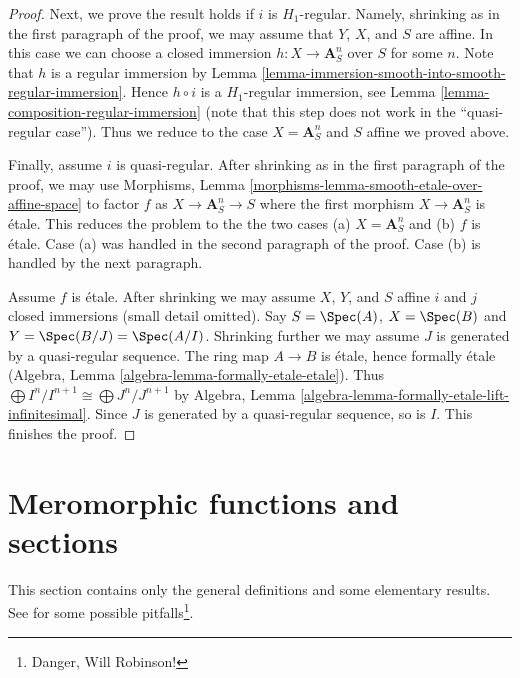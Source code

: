 \begin{proof}
\medskip\noindent
Next, we prove the result holds if $i$ is $H_1$-regular.
Namely, shrinking as in the first paragraph of the proof, we may assume that
$Y$, $X$, and $S$ are affine. In this case we can choose a closed
immersion $h : X \to \mathbf{A}^n_S$ over $S$ for some $n$. Note that
$h$ is a regular immersion by
Lemma \ref{lemma-immersion-smooth-into-smooth-regular-immersion}.
Hence $h \circ i$ is a $H_1$-regular immersion, see
Lemma \ref{lemma-composition-regular-immersion} (note that this step
does not work in the ``quasi-regular case'').
Thus we reduce to the case $X = \mathbf{A}^n_S$ and $S$ affine
we proved above.

\medskip\noindent
Finally, assume $i$ is quasi-regular. After shrinking as in the first
paragraph of the proof, we may use Morphisms, Lemma
\ref{morphisms-lemma-smooth-etale-over-affine-space}
to factor $f$ as $X \to \mathbf{A}^n_S \to S$ where the first
morphism $X \to \mathbf{A}^n_S$ is \'etale. This reduces the problem
to the the two cases (a) $X = \mathbf{A}^n_S$ and (b) $f$ is \'etale.
Case (a) was handled in the second paragraph of the proof.
Case (b) is handled by the next paragraph.

\medskip\noindent
Assume $f$ is \'etale. After shrinking we may assume $X$, $Y$, and $S$
affine $i$ and $j$ closed immersions (small detail omitted).
Say $S = \Spec(A)$, $X = \Spec(B)$ and $Y = \Spec(B/J) = \Spec(A/I)$.
Shrinking further we may assume $J$ is generated by a quasi-regular sequence.
The ring map $A \to B$ is \'etale, hence formally \'etale
(Algebra, Lemma \ref{algebra-lemma-formally-etale-etale}).
Thus $\bigoplus I^n/I^{n + 1} \cong \bigoplus J^n/J^{n + 1}$
by Algebra, Lemma \ref{algebra-lemma-formally-etale-lift-infinitesimal}.
Since $J$ is generated by a quasi-regular sequence, so is $I$.
This finishes the proof.
\end{proof}











\section{Meromorphic functions and sections}
\label{section-meromorphic-functions}

\noindent
This section contains only the general definitions and some elementary results.
See \cite{misconceptions} for some possible
pitfalls\footnote{Danger, Will Robinson!}.

